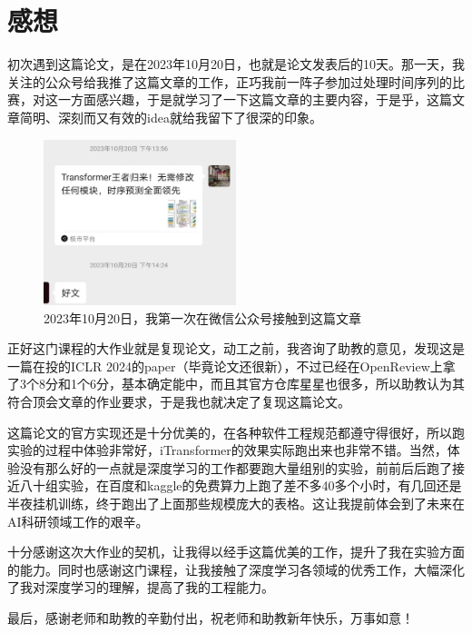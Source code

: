 \documentclass[twoside,12pt]{article}
\begin{document}
\section{感想}

初次遇到这篇论文，是在2023年10月20日，也就是论文发表后的10天。那一天，我关注的公众号给我推了这篇文章的工作，正巧我前一阵子参加过处理时间序列的比赛，对这一方面感兴趣，于是就学习了一下这篇文章的主要内容，于是乎，这篇文章简明、深刻而又有效的idea就给我留下了很深的印象。

\begin{figure}[htbp]
  \centering
  \includegraphics[width=0.5\textwidth]{./pic/itransformer_公众号.jpg}
  \caption{\small{2023年10月20日，我第一次在微信公众号接触到这篇文章}}
  \label{fig:wechat}
\end{figure}

正好这门课程的大作业就是复现论文，动工之前，我咨询了助教的意见，发现这是一篇在投的ICLR 2024的paper（毕竟论文还很新），不过已经在OpenReview上拿了3个8分和1个6分，基本确定能中，而且其官方仓库星星也很多，所以助教认为其符合顶会文章的作业要求，于是我也就决定了复现这篇论文。

这篇论文的官方实现还是十分优美的，在各种软件工程规范都遵守得很好，所以跑实验的过程中体验非常好，iTransformer的效果实际跑出来也非常不错。当然，体验没有那么好的一点就是深度学习的工作都要跑大量组别的实验，前前后后跑了接近八十组实验，在百度和kaggle的免费算力上跑了差不多40多个小时，有几回还是半夜挂机训练，终于跑出了上面那些规模庞大的表格。这让我提前体会到了未来在AI科研领域工作的艰辛。

十分感谢这次大作业的契机，让我得以经手这篇优美的工作，提升了我在实验方面的能力。同时也感谢这门课程，让我接触了深度学习各领域的优秀工作，大幅深化了我对深度学习的理解，提高了我的工程能力。

最后，感谢老师和助教的辛勤付出，祝老师和助教新年快乐，万事如意！





\vfill
\end{document}
